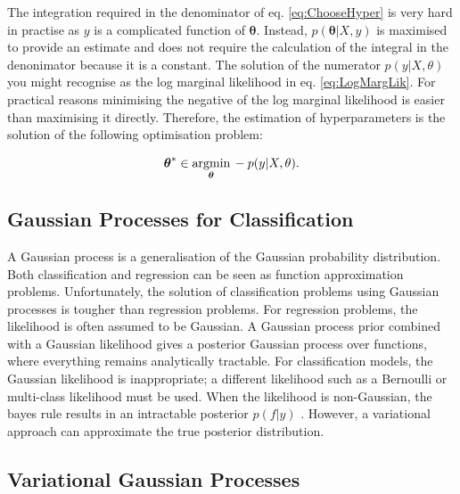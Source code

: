 \documentclass[12pt,a4paper]{report}
\theoremstyle{definition}
\begin{document}
The integration required in the denominator of eq. \ref{eq:ChooseHyper} is very hard in practise as $y$ is a complicated function of $\boldsymbol{\theta}$. 
Instead, $p(\boldsymbol{\theta} | X, y)$ is maximised to provide an estimate and does not require the calculation of the integral in the denonimator because it is a constant.
The solution of the numerator $p(y | X, \theta)$ you might recognise as the log marginal likelihood in eq. \ref{eq:LogMargLik}. 
For practical reasons minimising the negative of the log marginal likelihood is easier than maximising it directly.
Therefore, the estimation of hyperparameters is the solution of the following optimisation problem:

\begin{equation}
	\centering
	\boldsymbol{\theta}^* \in \underset{\boldsymbol{\theta}}{\textrm{argmin}} \, -p(y | X, \theta).
\end{equation}

\subsection{Gaussian Processes for Classification}

A Gaussian process is a generalisation of the Gaussian probability distribution. 
Both classification and regression can be seen as function approximation problems. 
Unfortunately, the solution of classification problems using Gaussian processes is tougher than regression problems. 
For regression problems, the likelihood is often assumed to be Gaussian. 
A Gaussian process prior combined with a Gaussian likelihood gives a posterior Gaussian process over functions, where everything remains analytically tractable. 
For classification models, the Gaussian likelihood is inappropriate; a different likelihood such as a Bernoulli or multi-class likelihood must be used.
When the likelihood is non-Gaussian, the bayes rule results in an intractable posterior $p(f|y)$ \citep{Yi2020}.
However, a variational approach can approximate the true posterior distribution.


\subsection{Variational Gaussian Processes}
\end{document}
